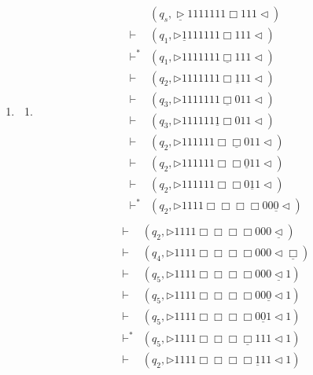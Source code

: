 \documentclass[12pt,a4paper]{article}
\makeatletter
\newtheorem*{solution}{Solution}
\theoremstyle{definition}
\renewenvironment{solution}[1][Solution] {\par\pushQED{\qed}\normalfont\topsep6\p@\@plus6\p@\relax\trivlist\item[\hskip\labelsep\bfseries#1\@addpunct{.}]\ignorespaces}{\popQED\endtrivlist\@endpefalse} \makeatother
\makeatother
\begin{document}
\begin{enumerate}
\begin{solution}
\begin{enumerate}
			\item 
			\begin{align*}
				&(q_s,\underline{\triangleright}  1  1  1  1  1  1  1  \Box 1  1  1   \triangleleft)\\
				\vdash &(q_1,\triangleright  \underline{1}  1  1  1  1  1  1  \Box 1  1  1   \triangleleft)\\
				\vdash^* &(q_1,\triangleright  1  1  1  1  1  1  1  \underline{\Box} 1  1  1   \triangleleft)\\		
				\vdash &(q_2,\triangleright  1  1  1  1  1  1  1  \Box \underline{1}  1  1   \triangleleft)\\
				\vdash &(q_3,\triangleright  1  1  1  1  1  1  1  \underline{\Box} 0  1  1   \triangleleft)	\\
				\vdash &(q_3,\triangleright  1  1  1  1  1  1  \underline{1} \Box 0  1  1   \triangleleft)\\
				\vdash &(q_2,\triangleright  1  1  1  1  1  1  \Box \underline{\Box}  0  1  1   \triangleleft)\\	
				\vdash &(q_2,\triangleright  1  1  1  1  1  1  \Box \Box \underline{0}  1  1   \triangleleft)\\		
				\vdash &(q_2,\triangleright  1  1  1  1  1  1  \Box \Box  0 \underline{1}  1   \triangleleft)\\
				\vdash^* &(q_2,\triangleright  1  1  1  1   \Box \Box  \Box \Box  0  0  \underline{0}   \triangleleft)\\
			\end{align*}
			\begin{align*}
				\vdash  &(q_2,\triangleright  1  1  1  1   \Box \Box  \Box \Box  0  0  0  \underline{\triangleleft})\\
				\vdash  &(q_4,\triangleright  1  1  1  1   \Box \Box  \Box \Box  0  0  0 \triangleleft \underline{\Box})\\
				\vdash  &(q_5,\triangleright  1  1  1  1   \Box \Box  \Box \Box  0  0  0  \underline{\triangleleft} 1)\\
				\vdash  &(q_5,\triangleright  1  1  1  1   \Box \Box  \Box \Box  0  0  \underline{0}  \triangleleft 1)\\
				\vdash  &(q_5,\triangleright  1  1  1  1   \Box \Box  \Box \Box  0  \underline{0} 1 \triangleleft 1)\\
				\vdash^*  &(q_5,\triangleright  1  1  1  1   \Box \Box  \Box \underline{\Box}  1  1  1  \triangleleft 1)\\
				\vdash  &(q_2,\triangleright  1  1  1  1   \Box \Box  \Box \Box   \underline{1} 1 1 \triangleleft 1)\\

\end{align*}
\end{enumerate}
\end{solution}
\end{enumerate}
\end{document}
